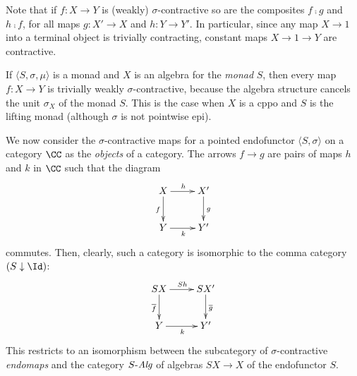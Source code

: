 \documentclass[11pt,a4paper]{article}
\newcommand{\tuple}[1]{\langle #1 \rangle }
\renewcommand{\alg}[1]{#1 \mbox{-\textit{Alg}}}
\newcommand{\efunctor}{S}
\newcommand{\contr}{\sigma}
\newcommand{\contrcat}{\sigma \mbox{-\textit{EndoMaps}}}
\newcommand{\factored}[1]{\overline{#1}}
\newcommand{\pointedfunctor}{\tuple{\efunctor , \contr}}
\newcommand{\esse}{S}
\begin{document}

Note that if $f:X\rightarrow Y$ is (weakly) $\contr$-contractive
so are the composites $f\comp g$ and $h\comp f$,
for all maps $g:X' \rightarrow X$ and $h: Y\rightarrow Y'$.
In particular, since any map $X\rightarrow 1$
into a terminal object is trivially contracting,
constant maps $X\rightarrow 1 \rightarrow Y$ are 
contractive.

If $\tuple{\esse , \contr , \mu}$ is a monad
and $X$ is an algebra for the \emph{monad} $\esse$,
then every map $f: X\rightarrow Y$ is trivially 
weakly $\contr$-contractive,
because the algebra structure cancels 
the unit $\contr_X$ of the monad $\esse$.
This is the case when $X$ is a cppo and $\esse$
is the lifting monad (although $\contr$ is not pointwise epi).

We now consider the $\contr$-contractive 
maps for a pointed endofunctor $\pointedfunctor$
on a category $\CC$ as the \emph{objects} of a category.
The arrows $f\rightarrow g$
are pairs of maps $h$ and $k$ in $\CC$ such that the diagram
$$\xymatrix{
X \ar[d]_{f} \ar[r]^{h} 
     & X'\ar[d]^{g}
\\
Y \ar[r]_k &  Y'
}$$
commutes.
Then, clearly, such a category is isomorphic to the 
comma category
$(\esse \downarrow \Id )$:
$$\xymatrix{
{\esse X} \ar[d]_{\factored{f}} \ar[r]^{\esse h} 
     & {\esse X'} \ar[d]^{\factored{g}}
\\
Y \ar[r]_k &  Y'
}$$
This restricts to an isomorphism
between the subcategory of $\contr$-contractive \emph{endomaps}
and the category $\alg{\esse}$ of algebras $\esse X \rightarrow X$
of the endofunctor $\esse$.



\end{document}

